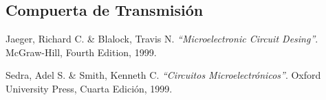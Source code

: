 \documentclass[twocolumn]{IEEEtran}
\begin{document}
\subsection{Compuerta de Transmisión}



\begin{thebibliography}{99}
   
   Jaeger, Richard C. \& Blalock, Travis N.
  {\em "`Microelectronic Circuit Desing"'}.
  McGraw-Hill, Fourth Edition, 1999.
  
   Sedra, Adel S. \& Smith, Kenneth C.
  {\em "`Circuitos Microelectrónicos"'}.
  Oxford University Press, Cuarta Edición, 1999.
  
  
\end{thebibliography}
\end{document}
